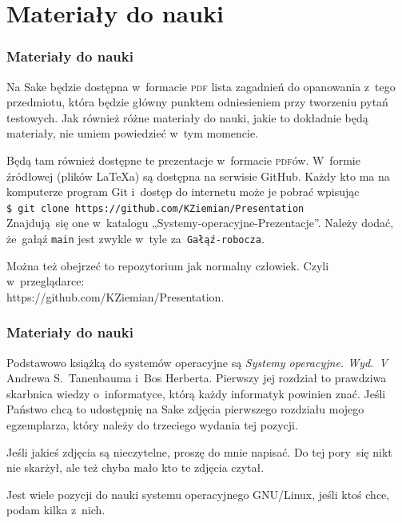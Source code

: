\documentclass[10pt,t]{beamer}
\begin{document}
\section{Materiały do nauki}


\begin{frame}
  \frametitle{Materiały do nauki}


  Na Sake będzie dostępna w~formacie \textsc{pdf} \alert{lista zagadnień do
    opanowania z~tego przedmiotu}, która będzie główny punktem odniesieniem
  przy tworzeniu pytań testowych. Jak również różne materiały do nauki,
  jakie to dokładnie będą materiały, nie umiem powiedzieć w~tym momencie.

  Będą tam również dostępne te prezentacje w~formacie \textsc{pdf}ów.
  W~formie źródłowej (plików \LaTeX a) są dostępna na serwisie GitHub.
  Każdy kto ma na komputerze program Git i~dostęp do internetu może je
  pobrać wpisując \\
  \texttt{\$ git clone https://github.com/KZiemian/Presentation} \\
  Znajdują~się one w~katalogu „Systemy-operacyjne-Prezentacje”. Należy
  dodać, że~gałąź \texttt{main} jest zwykle w~tyle
  za~\texttt{Gałąź-robocza}.

  Można też obejrzeć to repozytorium jak normalny człowiek. Czyli
  w~przeglądarce: \\
  {https://github.com/KZiemian/Presentation}.

\end{frame}





\begin{frame}
  \frametitle{Materiały do nauki}


  Podstawowo książką do systemów operacyjne są
  \textit{Systemy operacyjne. Wyd.~V} Andrewa S.~Tanenbauma i~Bos Herberta.
  Pierwszy jej rozdział to prawdziwa skarbnica wiedzy o~informatyce, którą
  każdy informatyk powinien znać. Jeśli Państwo chcą to udostępnię na Sake
  zdjęcia pierwszego rozdziału mojego egzemplarza, który należy do
  trzeciego wydania tej pozycji.

  Jeśli jakieś zdjęcia są nieczytelne, proszę do mnie napisać. Do tej
  pory~się nikt nie skarżył, ale też chyba mało kto te zdjęcia czytał.

  Jest wiele pozycji do nauki systemu operacyjnego GNU/Linux, jeśli ktoś
  chce, podam kilka z~nich.

\end{frame}
\end{document}
